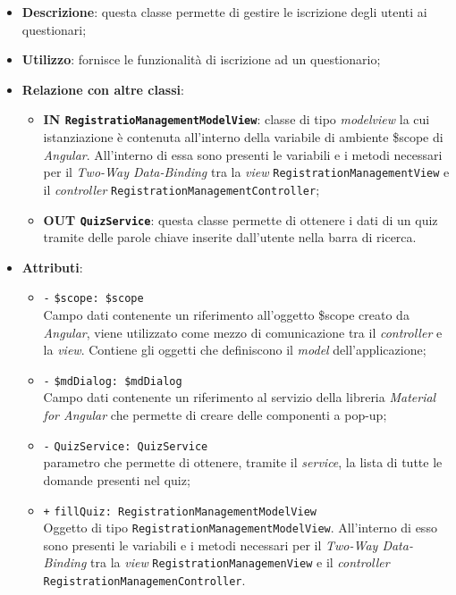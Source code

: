 \begin{itemize}
	\item \textbf{Descrizione}: questa classe permette di gestire le iscrizione degli utenti ai questionari;
	\item \textbf{Utilizzo}: fornisce le funzionalità di iscrizione ad un questionario;
	\item \textbf{Relazione con altre classi}:
	\begin{itemize}
		\item \textbf{IN \texttt{RegistratioManagementModelView}}: classe di tipo \textit{modelview} la cui istanziazione è contenuta all'interno della variabile di ambiente \$scope di \textit{Angular}. All'interno di essa sono presenti le variabili e i metodi necessari per il \textit{Two-Way Data-Binding} tra la \textit{view} \texttt{RegistrationManagementView} e il \textit{controller} \texttt{RegistrationManagementController}; 
		\item \textbf{OUT \texttt{QuizService}}: questa classe permette di ottenere i dati di un quiz tramite delle parole chiave inserite dall'utente nella barra di ricerca.
	\end{itemize}
	\item \textbf{Attributi}:
	\begin{itemize}
		\item \texttt{-} \texttt{\$scope: \$scope} \\
		Campo dati contenente un riferimento all'oggetto \$scope creato da \textit{Angular}, viene utilizzato come mezzo di comunicazione tra il \textit{controller} e la \textit{view}. Contiene gli oggetti che definiscono il \textit{model} dell'applicazione;
		\item \texttt{-} \texttt{\$mdDialog: \$mdDialog} \\
		Campo dati contenente un riferimento al servizio della libreria \textit{Material for Angular} che permette di creare delle componenti a pop-up;
		\item \texttt{-} \texttt{QuizService: QuizService}\\ parametro che permette di ottenere, tramite il \textit{service}, la lista di tutte le domande presenti nel quiz;
		\item \texttt{+} \texttt{fillQuiz: RegistrationManagementModelView} \\
		Oggetto di tipo \texttt{RegistrationManagementModelView}. All'interno di esso sono presenti le variabili e i metodi necessari per il \textit{Two-Way Data-Binding} tra la \textit{view} \texttt{RegistrationManagemenView} e il \textit{controller} \texttt{RegistrationManagemenController}.

\end{itemize}
\end{itemize}
